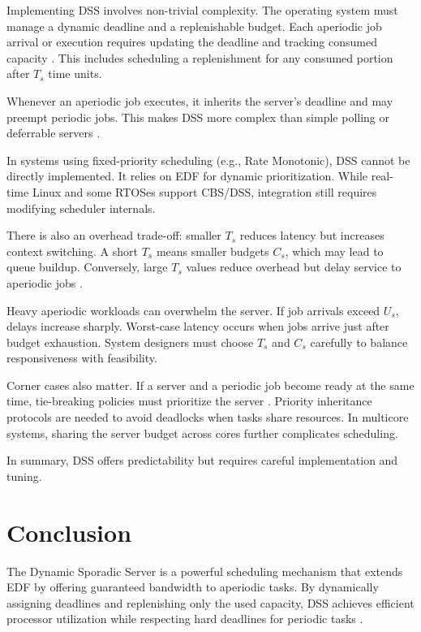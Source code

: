 \documentclass[conference]{IEEEtran}
\begin{document}
Implementing DSS involves non-trivial complexity. The operating system must manage a dynamic deadline and a replenishable budget. Each aperiodic job arrival or execution requires updating the deadline and tracking consumed capacity \cite{buttazzo2011hard, spuri1994efficient}. This includes scheduling a replenishment for any consumed portion after $T_s$ time units.

Whenever an aperiodic job executes, it inherits the server’s deadline and may preempt periodic jobs. This makes DSS more complex than simple polling or deferrable servers \cite{spuri1994efficient,laplante2011real, buttazzo2011hard}.

In systems using fixed-priority scheduling (e.g., Rate Monotonic), DSS cannot be directly implemented. It relies on EDF for dynamic prioritization. While real-time Linux and some RTOSes support CBS/DSS, integration still requires modifying scheduler internals.

There is also an overhead trade-off: smaller $T_s$ reduces latency but increases context switching. A short $T_s$ means smaller budgets $C_s$, which may lead to queue buildup. Conversely, large $T_s$ values reduce overhead but delay service to aperiodic jobs \cite{spuri1994efficient,laplante2011real}.

Heavy aperiodic workloads can overwhelm the server. If job arrivals exceed $U_s$, delays increase sharply. Worst-case latency occurs when jobs arrive just after budget exhaustion. System designers must choose $T_s$ and $C_s$ carefully to balance responsiveness with feasibility.

Corner cases also matter. If a server and a periodic job become ready at the same time, tie-breaking policies must prioritize the server \cite{buttazzo2011hard, spuri1994efficient}. Priority inheritance protocols are needed to avoid deadlocks when tasks share resources. In multicore systems, sharing the server budget across cores further complicates scheduling.

In summary, DSS offers predictability but requires careful implementation and tuning.

\vspace{1em}
\section{Conclusion}

The Dynamic Sporadic Server is a powerful scheduling mechanism that extends EDF by offering guaranteed bandwidth to aperiodic tasks. By dynamically assigning deadlines and replenishing only the used capacity, DSS achieves efficient processor utilization while respecting hard deadlines for periodic tasks \cite{spuri1994efficient, buttazzo2011hard}.
\end{document}

